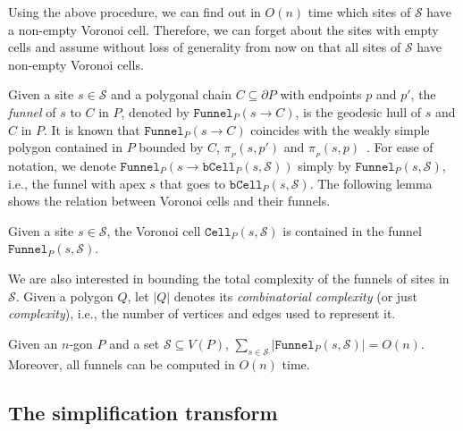 \documentclass[a4paper,UKenglish]{socg-lipics-v2018}
\newcommand{\s}{\mathcal S}
\newcommand{\p}[3][P]{\ensuremath{\pi_{_{#1}}(#2, #3)}}
\newcommand{\funnel}[2][P]{\ensuremath{\mathtt{Funnel}_{\scriptscriptstyle #1}(#2)}}
\newcommand{\cell}[2][P]{\ensuremath{\mathtt{Cell}_{\scriptscriptstyle #1}(#2)}}
\newcommand{\bcell}[2][P]{\ensuremath{\mathtt{bCell}_{\scriptscriptstyle #1}(#2)}}
\begin{document}
Using the above procedure, we can find out in $O(n)$ time which sites of $\s$ have a non-empty Voronoi cell. 
Therefore, we can forget about the sites with empty cells and assume without loss of generality from now on that all sites of $\s$ have non-empty Voronoi cells.

Given a site $s\in \s$ and a polygonal chain $C \subseteq \partial P$ with endpoints $p$ and $p'$, the \emph{funnel} of $s$ to $C$ in $P$, denoted by $\funnel{s\to C}$, 
is the geodesic hull of $s$ and $C$ in $P$. 
It is known that $\funnel{s\to C}$ coincides with the weakly simple polygon contained in $P$ bounded by $C$, $\p{s}{p'}$ and $\p{s}{p}$~\cite{ahn2015linear}.
For ease of notation, we denote $\funnel{s \to \bcell{s, \s}}$ simply by $\funnel{s, \s}$, i.e., the funnel with apex $s$ that goes to $\bcell{s, \s}$.
The following lemma shows the relation between Voronoi cells and their funnels.


\begin{lemma}\label{lemma:Voronoi cell in funnel}
Given a site $s\in \s$, the Voronoi cell $\cell{s, \s}$ is contained in the funnel $\funnel{s, \s}$.
\end{lemma}

We are also interested in bounding the total complexity of the funnels of sites in $\s$.
Given a polygon $Q$, let $|Q|$ denotes its \emph{combinatorial complexity} (or just \emph{complexity}), i.e., the number of vertices and edges used to represent it. 

\begin{lemma}\label{lemma:Complexity of funnels}
Given an $n$-gon $P$ and a set $\s\subseteq V(P)$, $\sum_{s\in \s} |\funnel{s, \s}| = O(n)$.
Moreover, all funnels can be computed in $O(n)$ time. 
\end{lemma}

\subsection{The simplification transform}\label{section:Simplification}
\end{document}
